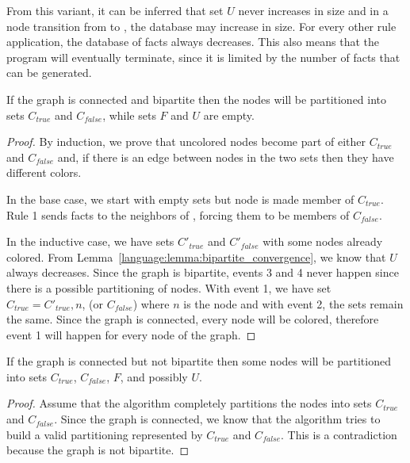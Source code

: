 From this variant, it can be inferred that set $U$ never increases in size
and in a node transition from  to , the
database may increase in size. For every other rule application, the database of
facts always decreases. This also means that the program will eventually
terminate, since it is limited by the number of  facts that can be
generated.

\begin{theorem}

If the graph is connected and bipartite then the nodes will be partitioned into sets
$C_{true}$ and $C_{false}$, while sets $F$ and $U$ are empty.

\end{theorem}
\begin{proof}
   By induction, we prove that uncolored nodes become part of either $C_{true}$
   and $C_{false}$ and, if there is an edge between nodes in the two sets then
   they have different colors.

   In the base case, we start with empty sets but node  is made
   member of $C_{true}$. Rule 1 sends  facts to the neighbors of
   , forcing them to be members of $C_{false}$.

   In the inductive case, we have sets $C'_{true}$ and $C'_{false}$ with some
   nodes already colored. From Lemma~\ref{language:lemma:bipartite_convergence},
   we know that $U$ always decreases. Since the graph is bipartite, events 3 and
   4 never happen since there is a possible partitioning of nodes. With event 1,
   we have set $C_{true} = C'_{true}, n$, (or $C_{false}$) where $n$ is the
   node and with event 2, the sets remain the same. Since the graph is
   connected, every node will be colored, therefore event 1 will happen for
   every node of the graph.
\end{proof}

\begin{theorem}
If the graph is connected but not bipartite then some nodes will be partitioned
into sets $C_{true}$, $C_{false}$, $F$, and possibly $U$.
\end{theorem}
\begin{proof}

Assume that the algorithm completely partitions the nodes into sets $C_{true}$
and $C_{false}$. Since the graph is connected, we know that the algorithm tries
to build a valid partitioning represented by $C_{true}$ and $C_{false}$. This is
a contradiction because the graph is not bipartite.

\end{proof}

